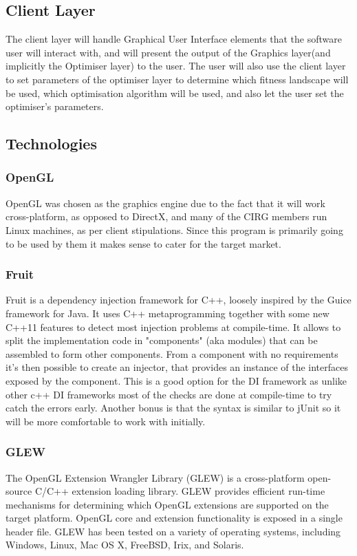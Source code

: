 \documentclass[11pt]{article}
\begin{document}
\subsection{Client Layer}
The client layer will handle Graphical User Interface elements that the software user will interact with, and will present the output of the Graphics layer(and implicitly the Optimiser layer) to the user. The user will also use the client layer to set parameters of the optimiser layer to determine which fitness landscape will be used, which optimisation algorithm will be used, and also let the user set the optimiser's parameters.
\subsection{Technologies}
\subsubsection{OpenGL}
OpenGL was chosen as the graphics engine due to the fact that it will work cross-platform, as opposed to DirectX, and many of the CIRG members run Linux machines, as per client stipulations. Since this program is primarily going to be used by them it makes sense to cater for the target market. 
\subsubsection{Fruit}
Fruit is a dependency injection framework for C++, loosely inspired by the Guice framework for Java. It uses C++ metaprogramming together with some new C++11 features to detect most injection problems at compile-time. It allows to split the implementation code in "components" (aka modules) that can be assembled to form other components. From a component with no requirements it's then possible to create an injector, that provides an instance of the interfaces exposed by the component. This is a good option for the DI framework as unlike other c++ DI frameworks most of the checks are done at compile-time to try catch the errors early. Another bonus is that the syntax is similar to jUnit so it will be more comfortable to work with initially.
\subsubsection{GLEW}
The OpenGL Extension Wrangler Library (GLEW) is a cross-platform open-source C/C++ extension loading library. GLEW provides efficient run-time mechanisms for determining which OpenGL extensions are supported on the target platform. OpenGL core and extension functionality is exposed in a single header file. GLEW has been tested on a variety of operating systems, including Windows, Linux, Mac OS X, FreeBSD, Irix, and Solaris.
\end{document}
